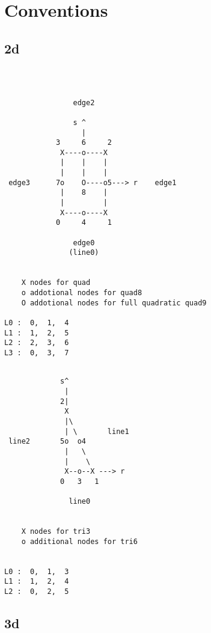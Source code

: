 \chapter{Conventions}


\section{2d}

\begin{verbatim}



                edge2

                s ^
                  |
            3     6     2
             X----o----X
             |    |    |
             |    |    |
 edge3      7o    O----o5---> r    edge1
             |    8    |
             |         |
             X----o----X
            0     4     1

                edge0
               (line0)


    X nodes for quad
    o addotional nodes for quad8
    O addotional nodes for full quadratic quad9

L0 :  0,  1,  4
L1 :  1,  2,  5
L2 :  2,  3,  6
L3 :  0,  3,  7

\end{verbatim}



\begin{verbatim}

             s^
              |
             2|
              X
              |\
              | \       line1
 line2       5o  o4
              |   \
              |    \
              X--o--X ---> r
             0   3   1

               line0


    X nodes for tri3
    o additional nodes for tri6


L0 :  0,  1,  3
L1 :  1,  2,  4
L2 :  0,  2,  5

\end{verbatim}





\newpage
\section{3d}

